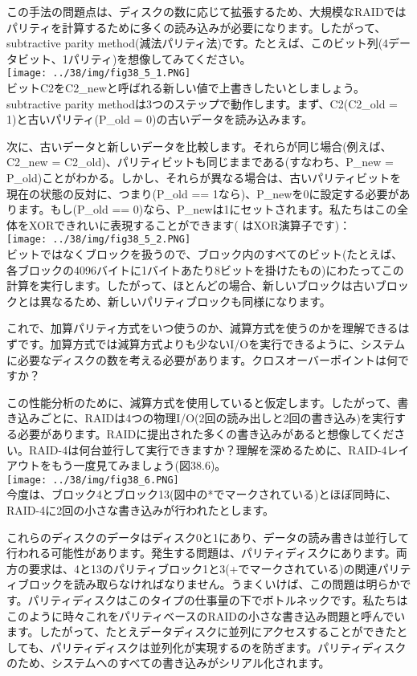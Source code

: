 この手法の問題点は、ディスクの数に応じて拡張するため、大規模なRAIDではパリティを計算するために多くの読み込みが必要になります。したがって、subtractive
parity
method(減法パリティ法)です。たとえば、このビット列(4データビット、1パリティ)を想像してみてください。\\
\texttt{[image: ../38/img/fig38\_5\_1.PNG]}\\
ビットC2をC2\_newと呼ばれる新しい値で上書きしたいとしましょう。subtractive
parity methodは3つのステップで動作します。まず、C2(C2\_old =
1)と古いパリティ(P\_old = 0)の古いデータを読み込みます。

次に、古いデータと新しいデータを比較します。それらが同じ場合(例えば、C2\_new
= C2\_old)、パリティビットも同じままである(すなわち、P\_new =
P\_old)ことがわかる。しかし、それらが異なる場合は、古いパリティビットを現在の状態の反対に、つまり(P\_old
== 1なら)、P\_newを0に設定する必要があります。もし(P\_old ==
0)なら、P\_newは1にセットされます。私たちはこの全体をXORできれいに表現することができます(
\xor はXOR演算子です)：\\
\texttt{[image: ../38/img/fig38\_5\_2.PNG]}\\
ビットではなくブロックを扱うので、ブロック内のすべてのビット(たとえば、各ブロックの4096バイトに1バイトあたり8ビットを掛けたもの)にわたってこの計算を実行します。したがって、ほとんどの場合、新しいブロックは古いブロックとは異なるため、新しいパリティブロックも同様になります。

これで、加算パリティ方式をいつ使うのか、減算方式を使うのかを理解できるはずです。加算方式では減算方式よりも少ないI/Oを実行できるように、システムに必要なディスクの数を考える必要があります。クロスオーバーポイントは何ですか？

この性能分析のために、減算方式を使用していると仮定します。したがって、書き込みごとに、RAIDは4つの物理I/O(2回の読み出しと2回の書き込み)を実行する必要があります。RAIDに提出された多くの書き込みがあると想像してください。RAID-4は何台並行して実行できますか？理解を深めるために、RAID-4レイアウトをもう一度見てみましょう(図38.6)。\\
\texttt{[image: ../38/img/fig38\_6.PNG]}\\
今度は、ブロック4とブロック13(図中の*でマークされている)とほぼ同時に、RAID-4に2回の小さな書き込みが行われたとします。

これらのディスクのデータはディスク0と1にあり、データの読み書きは並行して行われる可能性があります。発生する問題は、パリティディスクにあります。両方の要求は、4と13のパリティブロック1と3(+でマークされている)の関連パリティブロックを読み取らなければなりません。うまくいけば、この問題は明らかです。パリティディスクはこのタイプの仕事量の下でボトルネックです。私たちはこのように時々これをパリティベースのRAIDの小さな書き込み問題と呼んでいます。したがって、たとえデータディスクに並列にアクセスすることができたとしても、パリティディスクは並列化が実現するのを防ぎます。パリティディスクのため、システムへのすべての書き込みがシリアル化されます。

